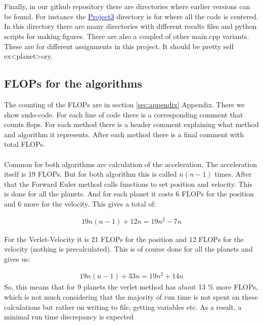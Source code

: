 \\
\\
Finally, in our github repository there are directories where earlier versions can be found. For instance the 
\href{https://github.com/erikfsk/Project-3/tree/master/Project3/}{\textcolor{blue}{Project3}} directory is for where all the code is centered. In this directory there are many directories with different results files and python scripts for making figures. There are also a coupled of other main.cpp variants. These are for different assignments in this project. It should be pretty self ex<planet>ory. 


\subsection{FLOPs for the algorithms}\label{sec:flops}

The counting of the FLOPs are in section \ref{sec:appendix} Appendix. There we show sudo-code. For each line of code there is a corresponding comment that counts flops. For each method there is a header comment explaining what method and algorithm it represents. After each method there is a final comment with total FLOPs.
\\
\\
Common for both algorithms are calculation of the acceleration. The acceleration itself is 19 FLOPs. But for both algorithm this is called $n(n-1)$ times. After that the Forward Euler method calls functions to set position and velocity. This is done for all the planets. And for each planet it costs 6 FLOPs for the position and 6 more for the velocity. This gives a total of:

\begin{align*}
	19n(n-1) + 12n = 19n^2 - 7n
\end{align*}

For the Verlet-Velocity it is 21 FLOPs for the position and 12 FLOPs for the velocity (nothing is precalculated). This is of course done for all the planets and gives us: 

\begin{align*}
	19n(n-1) + 33n = 19n^2 + 14n
\end{align*}
So, this means that for 9 planets the verlet method has about 13 \% more FLOPs, which is not much considering that the majority of run time is not spent on these calculations but rather on writing to file, getting variables etc. As a result, a minimal run time discrepancy is expected

























